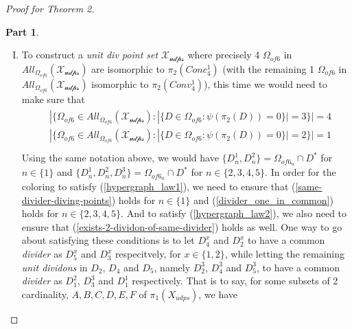 \documentclass[11pt, oneside]{article}      %
\theoremstyle{definition}
\newtheorem{proofpart}{Part}[theo]
\numberwithin{equation}{section}
\newcommand{\reff}[1]{(\ref{#1})}
\newcommand\undervec[1]{\underaccent{\vec}{#1}}
\theoremstyle{c}
\begin{document}
\begin{proof}[Proof for Theorem 2]
\begin{proofpart}
\begin{enumerate}[I.]
\begin{equation}
\begin{gathered}
\end{gathered}
\end{equation}
where
\begin{gather*}
A \not=B \not=C \not=D \not=E \not=F \\
|A \cap B \cap C| = 1 \\
|A \cap B \cap D| = 1 \\
(C \cap E) = (D \cap F) = (E \cap F) = \varnothing
\end{gather*}
$\mathscr{X_{udps}}$ described above is in $\mathscr{UDPS}^{\Theta}$ because there exists $\mathscr{X_{dps}} \in \mathscr{DPS}^+$ where $\undervec{\mathscr{F}}_{\mathscr{udps}}^{\mathscr{DPS}}(\mathscr{X_{dps}})=\mathscr{X_{udps}}$: such $\mathscr{X_{dps}}$ would be isomorphic to $Conc_5^1$ defined in \reff{stronger-theorem-2}.
\item To construct a \textit{unit div point set} $\mathscr{X_{udps}}$ where precisely 4 $\Omega_{of 6}$ in $All_{\Omega_{of 6}}(\mathscr{X_{udps}})$ are isomorphic to $\pi_2(Conc_4^1)$ (with the remaining 1 $\Omega_{of 6}$ in $All_{\Omega_{of 6}}(\mathscr{X_{udps}})$ isomorphic to $\pi_2(Conv_4^1)$), this time we would need to make sure that
\begin{align}
\begin{split}
& |\{ \Omega_{of 6}  \in All_{\Omega_{of 6}}(\mathscr{X_{udps}}) :  |\{D \in \Omega_{of 6} : \psi(\pi_2(D)) = 0 \}| = 3 \}| = 4 \\
& |\{ \Omega_{of 6}  \in All_{\Omega_{of 6}}(\mathscr{X_{udps}}) :  |\{D \in \Omega_{of 6} : \psi(\pi_2(D)) = 0 \}| = 2 \}| = 1 \\
\end{split}
\end{align}
Using the same notation above, we would have $\{D_n^1,D_n^2\} = \Omega_{of 6_n} \cap D^*$ for $n \in \{1\}$ and $ \{D_n^1,D_n^2,D_n^3\} = \Omega_{of 6_n} \cap D^*$ for $n \in \{2,3,4,5\}$. In order for the coloring to satisfy \reff{hypergraph_law1}, we need to ensure that \reff{same-divider-diving-points} holds for $n \in \{1\}$ and \reff{divider_one_in_common} holds for $n \in \{2,3,4,5\}$. And to satisfy \reff{hypergraph_law2}, we also need to ensure that  \reff{exists-2-dividon-of-same-divider} holds as well. One way to go about satisfying these conditions is to let $D_4^x$ and $D_2^x$ to have a common \textit{divider} as $D_5^x$ and $D_3^x$ respecitvely, for $x \in \{1,2\}$, while letting the remaining \textit{unit dividons} in $D_2$, $D_4$ and $D_5$, namely $D_2^3$, $D_4^3$  and $D_5^3$, to have a common \textit{divider} as $D_1^2$, $D_3^3$ and $D_1^1$ respectively. That is to say, for some subsets of 2 cardinality, $A,B,C,D,E,F$ of $\pi_1(X_{udps})$, we have

\end{enumerate}
\end{proofpart}
\end{proof}
\end{document}
